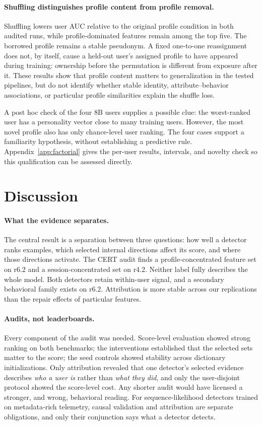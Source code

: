 \documentclass[10pt]{article} %
\begin{document}
\paragraph{Shuffling distinguishes profile content from profile removal.}
Shuffling lowers user AUC relative to the original profile condition
in both audited runs, while profile-dominated features remain among the
top five. The borrowed profile remains a stable pseudonym. A fixed
one-to-one reassignment does not, by itself, cause a held-out user's
assigned profile to have appeared during training: ownership before the
permutation is different from exposure after it. These results show that
profile content matters to generalization in the tested pipelines, but
do not identify whether stable identity, attribute--behavior associations,
or particular profile similarities explain the shuffle loss.

A post hoc check of the four 8B users supplies a possible clue: the
worst-ranked user has a personality vector close to many training users.
However, the most novel profile also has only chance-level user ranking.
The four cases support a familiarity hypothesis, without establishing a
predictive rule. Appendix~\ref{app:factorial} gives the per-user results,
intervals, and novelty check so this qualification can be assessed directly.

\section{Discussion}
\label{sec:discussion}

\paragraph{What the evidence separates.}
The central result is a separation between three questions: how well a
detector ranks examples, which selected internal directions affect its
score, and where those directions activate. The CERT audit finds a
profile-concentrated feature set on r6.2 and a session-concentrated set
on r4.2. Neither label fully describes the whole model. Both detectors
retain within-user signal, and a secondary behavioral family exists on
r6.2. Attribution is more stable across our replications than the
repair effects of particular features.

\paragraph{Audits, not leaderboards.}
Every component of the audit was needed. Score-level evaluation showed
strong ranking on both benchmarks; the interventions established that the
selected sets matter to the score; the seed controls showed stability across
dictionary initializations. Only attribution revealed that one detector's
selected evidence describes \emph{who a user is} rather than \emph{what they
did}, and only the user-disjoint protocol showed the score-level cost. Any
shorter audit would have licensed a stronger, and wrong, behavioral reading.
For sequence-likelihood detectors trained on metadata-rich telemetry, causal
validation and attribution are separate obligations, and only their
conjunction says what a detector detects.
\end{document}
